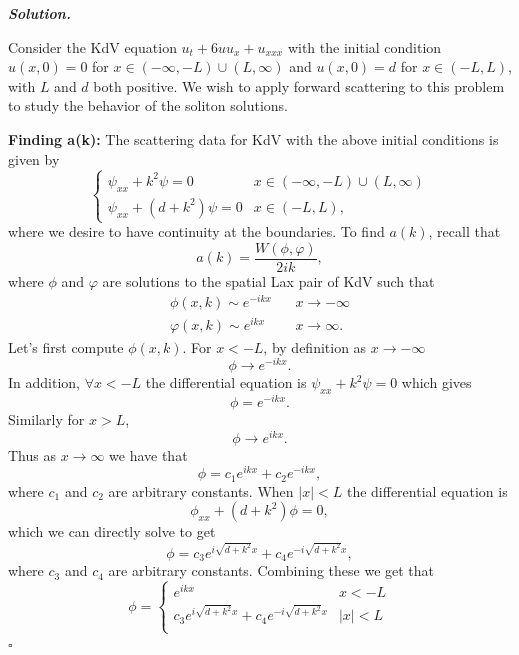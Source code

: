 \documentclass[12pt]{report}
\newenvironment{solution}[1][\it{Solution}]{\textbf{#1. } }{$\square$}
\begin{document}
\begin{solution}

    \noindent
    Consider the KdV equation $u_t + 6uu_x + u_{xxx}$ with the initial condition $u(x,0)=0$ for $x\in (-\infty,-L)\cup(L,\infty)$ and $u(x,0)=d$ for $x\in(-L,L)$, with $L$ and $d$ both positive. We wish to apply forward scattering to this problem to study the behavior of the soliton solutions. 
    
    \noindent
    {\bf Finding a(k):} The scattering data for KdV with the above initial conditions is given by
    \[
        \begin{cases}
            \psi_{xx} + k^2\psi = 0 &x\in(-\infty,-L)\cup(L,\infty)\\
            \psi_{xx} + (d + k^2)\psi = 0 &x\in(-L,L),
        \end{cases}
    \]
    where we desire to have continuity at the boundaries.
    To find $a(k)$, recall that 
    \[
        a(k) = \frac{W(\phi,\varphi)}{2ik},
    \]
    where $\phi$ and $\varphi$ are solutions to the spatial Lax pair of KdV such that
    \begin{align*}
        \phi(x,k) \sim e^{-ikx} ~~~~ &x \to -\infty\\
        \varphi(x,k) \sim e^{ikx} ~~~~ &x \to \infty.
    \end{align*}
    Let's first compute $\phi(x,k)$. For $x < -L$, by definition as $x \to -\infty$
    \[
        \phi \to e^{-ikx}.
    \]
    In addition, $\forall x < -L$ the differential equation is $\psi_{xx} + k^2\psi = 0$ which gives
    \[ 
        \phi = e^{-ikx}.
    \]
    Similarly for $x > L$,
    \[ 
        \phi \to e^{ikx}.
    \]
    Thus as $x \to \infty$ we have that
    \begin{equation*}
        \phi = c_1 e^{ikx} + c_2 e^{-ikx},
    \end{equation*}
    where $c_1$ and $c_2$ are arbitrary constants. When $|x| < L$ the differential equation is
    \[ 
        \phi_{xx} + (d+k^2)\phi = 0,
    \]
    which we can directly solve to get
    \begin{equation*} 
        \phi = c_3 e^{i\sqrt{d + k^2}x} + c_4 e^{-i\sqrt{d + k^2}x},
    \end{equation*}
    where $c_3$ and $c_4$ are arbitrary constants.
    Combining these we get that
    \[ 
        \phi = \begin{cases}
            e^{ikx} &x < -L\\
            c_3 e^{i\sqrt{d + k^2}x} + c_4 e^{-i\sqrt{d + k^2}x}&|x| < L\\

\end{cases}\]
\end{solution}
\end{document}
